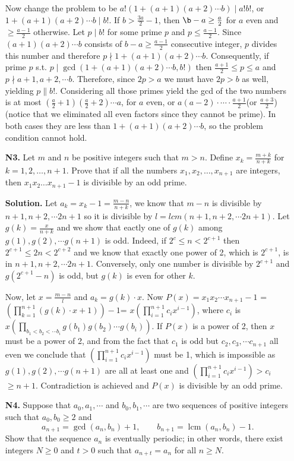 \documentclass[11pt,a4paper]{article}
\begin{document}
\begin{enumerate}
Now change the problem to be $a!(1+(a+1)(a+2)\cdots b)\mid a!b!$, or $1+(a+1)(a+2)\cdots b\mid b!$. If $b>\frac{3a}{2}-1$, then $\b-a\ge\frac{a}{2}$ for $a$ even and $\ge\frac{a-1}{2}$ otherwise. Let $p\mid b!$ for some prime $p$ and $p\le\frac{a-1}{2}$. Since $(a+1)(a+2)\cdots b$ consists of $b-a\ge\frac{a-1}{2}$ consecutive integer, $p$ divides this number and therefore $p\nmid 1+(a+1)(a+2)\cdots b$. Consequently, if prime $p$ s.t. $p\mid\gcd(1+(a+1)(a+2)\cdots b, b!)$ then $\frac{a+1}{2}\le p\le a$ and $p\nmid a+1, a+2,\cdots b$. Therefore, since $2p>a$ we must have $2p>b$ as well, yielding $p\parallel b!$. Considering all those primes yield the gcd of the two numbers is at most $(\frac{a}{2}+1)(\frac{a}{2}+2)\cdots a$, for $a$ even, or $a(a-2)\cdot\cdots\cdot\frac{a+1}{2}$(or $\frac{a+3}{2}$) (notice that we eliminated all even factors since they cannot be prime). In both cases they are less than $1+(a+1)(a+2)\cdots b$, so the problem condition cannot hold.

\item[\textbf{N3.}] Let $m$ and $n$ be positive integers such that $m>n$. Define $x_k=\frac{m+k}{n+k}$ for $k=1,2,\ldots,n+1$. Prove that if all the numbers $x_1,x_2,\ldots,x_{n+1}$ are integers, then $x_1x_2\ldots x_{n+1}-1$ is divisible by an odd prime.

\textbf{Solution.} Let $a_k=x_k-1=\frac{m-n}{n+k}$, we know that $m-n$ is divisible by $n+1, n+2, \cdots 2n+1$ so it is divisible by $l=lcm(n+1, n+2, \cdots 2n+1)$. Let $g(k)=\frac{x}{n+k}$ and we show that eactly one of $g(k)$ among $g(1), g(2),\cdots g(n+1)$ is odd. Indeed, if $2^c\le n< 2^{c+1}$ then $2^{c+1}\le 2n<2^{c+2}$ and we know that exactly one power of 2, which is $2^{c+1}$, is in $n+1, n+2,\cdots 2n+1$. Conversely, only one number is divisible by $2^{c+1}$ and $g(2^{c+1}-n)$ is odd, but $g(k)$ is even for other $k$.

Now, let $x=\frac{m-n}{l}$ and $a_k=g(k)\cdot x$. Now $P(x)=x_1x_2\cdots x_{n+1}-1$ = $(\prod_{k=1}^{n+1} (g(k)\cdot x+1))-1$= $x(\prod_{i=1}^{n+1} c_ix^{i-1})$, where $c_i$ is $x(\prod_{b_1<b_2<\cdots b_i} g(b_1)g(b_2)\cdots g(b_{i}))$. If $P(x)$ is a power of 2, then $x$ must be a power of 2, and from the fact that $c_1$ is odd but $c_2, c_3, \cdots c_{n+1}$ all even we conclude that $(\prod_{i=1}^{n+1} c_ix^{i-1})$ must be 1, which is impossible as $g(1), g(2),\cdots g(n+1)$ are all at least one and $(\prod_{i=1}^{n+1} c_ix^{i-1})>c_i$ $\ge n+1$. Contradiction is achieved and $P(x)$ is divisible by an odd prime.

\item[\textbf{N4.}] Suppose that $a_0, a_1, \cdots $ and $b_0, b_1, \cdots$ are two sequences of positive integers such that $a_0, b_0 \ge 2$ and \[ a_{n+1} = \gcd{(a_n, b_n)} + 1, \qquad b_{n+1} = \operatorname{lcm}{(a_n, b_n)} - 1. \]Show that the sequence $a_n$ is eventually periodic; in other words, there exist integers $N \ge 0$ and $t > 0$ such that $a_{n+t} = a_n$ for all $n \ge N$.


\end{enumerate}
\end{document}
